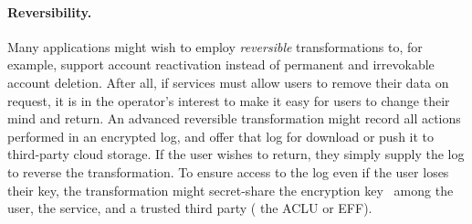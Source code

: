 \paragraph{Reversibility.}
%
Many applications might wish to employ \emph{reversible} transformations to, for example, support
account reactivation instead of permanent and irrevokable account deletion.
%
After all, if services must allow users to remove their data on request, it is in the operator's
interest to make it easy for users to change their mind and return.
%
An advanced reversible transformation might record all actions performed in an encrypted log, and
offer that log for download or push it to third-party cloud storage.
%
If the user wishes to return, they simply supply the log to reverse the transformation.
%
To ensure access to the log even if the user loses their key, the transformation might secret-share
the encryption key~\cite{secretsharing} among the user, the service, and a trusted third party (\eg
the ACLU or EFF).
%
